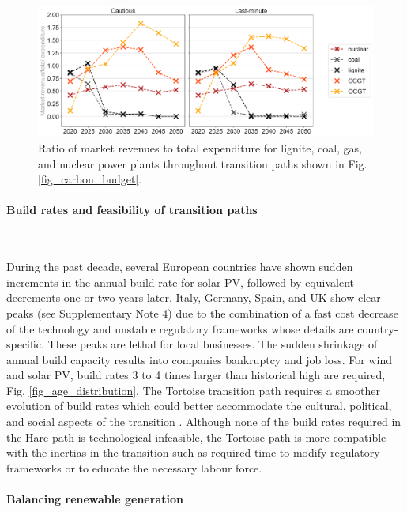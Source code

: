 \documentclass[5p]{elsarticle} %
\begin{document}
\begin{figure}[!h]
\centering
\includegraphics[width=\columnwidth]{figures/revenue_vs_expenditure_w_TYNDP.png}
\caption{Ratio of market revenues to total expenditure for lignite, coal, gas, and nuclear power plants throughout transition paths shown in Fig. \ref{fig_carbon_budget}. } \label{fig_revenue_vs_expenditure} 
\end{figure}

\paragraph{\textbf{Build rates and feasibility of transition paths}} \

During the past decade, several European countries have shown sudden increments in the annual build rate for solar PV, followed by equivalent decrements one or two years later. Italy, Germany, Spain, and UK show clear peaks (see Supplementary Note 4)  due to the combination of a fast cost decrease of the technology and unstable regulatory frameworks whose details are country-specific. These peaks are lethal for local businesses. The sudden shrinkage of annual build capacity results into companies bankruptcy and job loss. For wind and solar PV, build rates 3 to 4 times larger than historical high are required, Fig. \ref{fig_age_distribution}. The Tortoise transition path requires a smoother evolution of build rates which could better accommodate the cultural, political, and social aspects of the transition \cite{Geels_2017}. Although none of the build rates required in the Hare path is technological infeasible, the Tortoise path is more compatible with the inertias in the transition such as required time to modify regulatory frameworks or to educate the necessary labour force. 

\FloatBarrier

\paragraph{\textbf{Balancing renewable generation}} \
\end{document}
